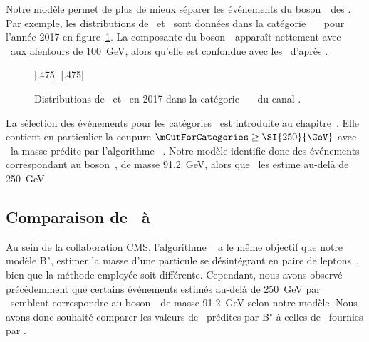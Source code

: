 \par
Notre modèle permet de plus de mieux séparer les événements du boson~\Zboson\ des \ftauhs.
Par exemple,
les distributions de \mTtot\ et \mml\ sont données dans la catégorie \CATbsm\ \CATnobtag\ \CATloosemt\ pour l'année 2017 en figure~\ref{fig-distributions_mml_mttot_2017_mt_BSM_nobtag_loosemt}.
La composante du boson~\Zboson\ apparaît nettement avec \mml\ aux alentours de \SI{100}{\GeV}, alors qu'elle est confondue avec les \ftauhs\ d'après \mTtot.
\begin{figure}[h]
\centering

[.475\textwidth]
{}
\hfill
{}[.475\textwidth]
{}

\caption[Distributions de \mTtot\ et \mml\ dans la catégorie \CATbsm\ \CATnobtag\ \CATloosemt\ du canal \mu\tauh.]{Distributions de \mTtot\ et \mml\ en 2017 dans la catégorie \CATbsm\ \CATnobtag\ \CATloosemt\ du canal \mu\tauh.}
\label{fig-distributions_mml_mttot_2017_mt_BSM_nobtag_loosemt}
\end{figure}
%
%
La sélection des événements pour les catégories \CATbsm\ est introduite au chapitre~.
Elle contient en particulier la coupure
$\mCutForCategories \geq \SI{250}{\GeV}$
avec \msv\ la masse prédite par l'algorithme \SVFIT~\cite{SVFit_Bianchini_2014}.
Notre modèle identifie donc des événements correspondant au boson~\Zboson,
de masse \SI{91.2}{\GeV},
alors que \SVFIT\ les estime au-delà de \SI{250}{\GeV}.
\subsection{Comparaison de \mml\ à \msv}
Au sein de la collaboration CMS, l'algorithme \SVFIT~\cite{SVFit_Bianchini_2014} a le même objectif que notre modèle B",
estimer la masse d'une particule se désintégrant en paire de leptons~\tau,
bien que la méthode employée soit différente.
Cependant, nous avons observé précédemment que certains événements estimés au-delà de \SI{250}{\GeV} par \SVFIT\ semblent correspondre au boson~\Zboson\ de masse \SI{91.2}{\GeV} selon notre modèle.
Nous avons donc souhaité comparer
les valeurs de \mml\ prédites par B"
à celles de \msv\ fournies par \SVFIT.

